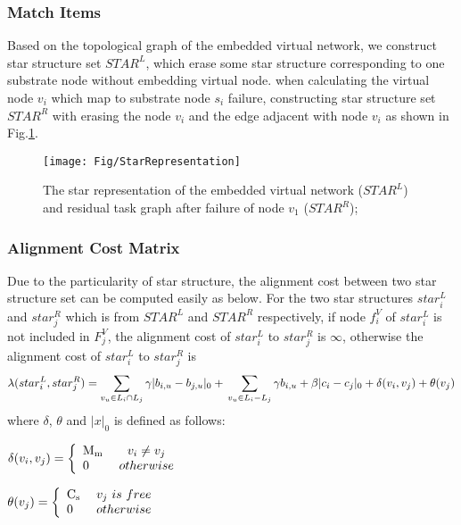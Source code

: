 \subsubsection{Match Items}
Based on the topological graph of the embedded virtual network, we construct star structure set $STAR^L$, which erase some star structure corresponding to one substrate node without embedding virtual node. when calculating the virtual node $v_i$ which map to substrate node $s_i$ failure, constructing star structure set $STAR^R$ with erasing the node $v_i$ and the edge adjacent with node $v_i$ as shown in Fig.\ref{fig:StarRepresentation}.
\begin{figure}
\centering
\texttt{[image: Fig/StarRepresentation]}\\
  \caption{The star representation of the embedded virtual network ($STAR^L$) and residual task graph after failure of node $v_1$ ($STAR^R$);}\label{fig:StarRepresentation}
\end{figure}
\subsubsection{Alignment Cost Matrix}
Due to the particularity of star structure, the alignment cost between two star structure set can be computed easily as below. For the two star structures $star^L_i$ and $star^R_j$ which is from $STAR^L$ and $STAR^R$ respectively, if node $f_i^V$ of $star^L_i$  is not included in $F^V_j$, the alignment cost of $star^L_i$ to $star^R_j$ is $\infty$, otherwise the alignment cost of $star^L_i$ to $star^R_j$ is
\[\lambda(star^L_i,star^R_j)=\sum\limits_{v_u\in L_i \cap L_j}\gamma|b_{i,u}-b_{j,u}|_0+\newline
\sum\limits_{v_u\in L_i - L_j}\gamma b_{i,u}+\beta|c_i-c_j|_0+ \delta(v_i,v_j)+\theta(v_j)\]
where $\delta$, $\theta$ and $|x|_0$ is defined as follows:

$\delta ({v_i},{v_j}) = \left\{ \begin{array}{l}
{\rm{M_{m}}}\\
0
\end{array} \right.\begin{array}{*{20}{c}}
v_i\neq v_j\\
{otherwise}
\end{array}$

$\theta ({v_j}) = \left\{ \begin{array}{l}
{\rm{C_{s}}}\\
0
\end{array} \right.\begin{array}{*{20}{c}}
v_j\ is\ free\\
{otherwise}
\end{array}$

